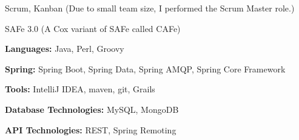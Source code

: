 \begin{cventries}
    {} %
    {} %
    {} %
    {\vspace{-0.5mm}
      \begin{cvitems} %
        \item {Scrum, Kanban (Due to small team size, I performed the Scrum Master role.)}
        \item {SAFe 3.0 (A Cox variant of SAFe called CAFe)}
      \end{cvitems}
    }

    {} %
    {} %
    {} %
    {\vspace{-0.5mm}
      \begin{cvitems} %
        \item {\textbf{Languages:} Java, Perl, Groovy}
        \item {\textbf{Spring:} Spring Boot, Spring Data, Spring AMQP, Spring Core Framework}
        \item {\textbf{Tools:} IntelliJ IDEA, maven, git, Grails}
        \item {\textbf{Database Technologies:} MySQL, MongoDB}
        \item {\textbf{API Technologies:} REST, Spring Remoting}
      \end{cvitems}
    }

\end{cventries}





